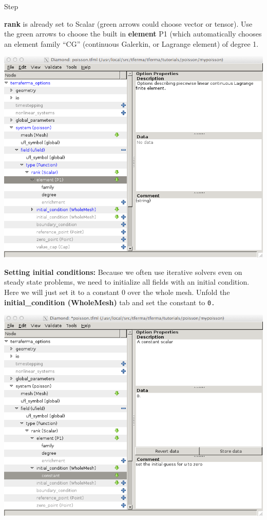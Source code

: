 \begin{steps}{Step}
\begin{center}
\end{center}
\textbf{rank} is already set to Scalar (green arrows could choose
vector or tensor). Use the green arrows to choose the built in
\textbf{element} P1 (which automatically chooses an element family
``CG'' (continuous Galerkin, or Lagrange element) of degree 1.
\begin{center}
    \includegraphics[width=\diamondwidth]{figures/screendumps/diamond_poisson_07b.png}
\end{center}
\item \textbf{Setting initial conditions:} Because we
  often use iterative solvers even on steady state problems, we need
  to initialize all fields with an initial condition.  Here we will
  just set it to a constant 0 over the whole mesh.  Unfold the
  \textbf{initial\_condition (WholeMesh)} tab and set the constant to
  \texttt{0.}
\begin{center}
    \includegraphics[width=\diamondwidth]{figures/screendumps/diamond_poisson_07c.png}

\end{center}
\end{steps}
